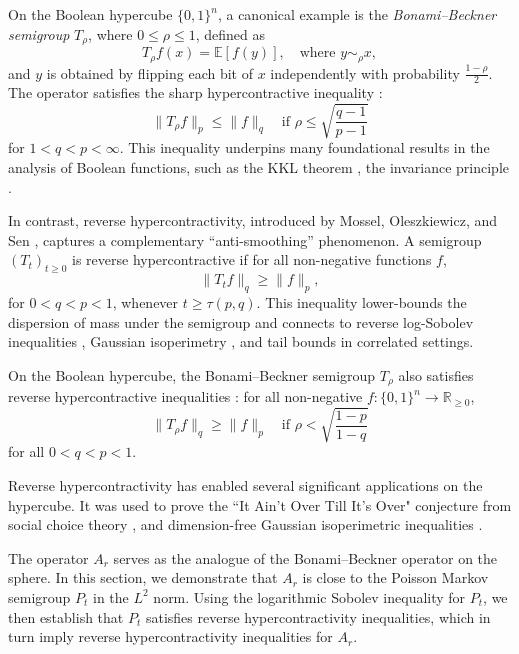 \documentclass[11pt]{article}
\begin{document}
On the Boolean hypercube \(\{0,1\}^n\), a canonical example is the \emph{Bonami–Beckner semigroup} \(T_\rho\), where \(0 \leq \rho \leq 1\), defined as
\[
T_\rho f(x) = \mathbb{E}[f(y)], \quad \text{where } y \sim_\rho x,
\]
and \(y\) is obtained by flipping each bit of \(x\) independently with probability \(\frac{1 - \rho}{2}\). The operator satisfies the sharp hypercontractive inequality \cite{bonami1970etude, nelson1973free, beckner1975inequalities, gross1975logarithmic}:
\[
\|T_\rho f\|_p \le \|f\|_q \quad \text{if } \rho \le \sqrt{\frac{q-1}{p-1}}
\]
for $1<q<p<\infty$. 
This inequality underpins many foundational results in the analysis of Boolean functions, such as the KKL theorem \cite{mossel2013reverse}, the invariance principle \cite{mossel2013reverse}.

In contrast, reverse hypercontractivity, introduced by Mossel, Oleszkiewicz, and Sen \cite{mossel2013reverse}, captures a complementary ``anti-smoothing'' phenomenon. A semigroup \( (T_t)_{t \geq 0} \) is reverse hypercontractive if for all non-negative functions \(f\),
\[
\|T_t f\|_q \ge \|f\|_p,
\]
for \(0 < q < p < 1\), whenever \(t \ge \tau(p,q)\). This inequality lower-bounds the dispersion of mass under the semigroup and connects to reverse log-Sobolev inequalities \cite{mossel2013reverse}, Gaussian isoperimetry \cite{mossel2015robust}, and tail bounds in correlated settings.

On the Boolean hypercube, the Bonami–Beckner semigroup \(T_\rho\) also satisfies reverse hypercontractive inequalities \cite{mossel2013reverse}: for all non-negative $f : \{0,1\}^n \to \mathbb{R}_{\geq 0}$,
\[
\|T_\rho f\|_q \ge \|f\|_p\quad\text{if } \rho < \sqrt{\frac{1 - p}{1 - q}} 
\]
for all $0<q<p<1$. 

Reverse hypercontractivity has enabled several significant applications on the hypercube. It was used to prove the ``It Ain’t Over Till It’s Over" conjecture \cite{khot2002power} from social choice theory \cite{mossel2005noise}, and dimension-free Gaussian isoperimetric inequalities \cite{mossel2015robust}.

The operator $A_r$ serves as the analogue of the Bonami–Beckner operator on the sphere. In this section, we demonstrate that $A_r$ is close to the Poisson Markov semigroup $P_t$ in the $L^2$ norm. Using the logarithmic Sobolev inequality for $P_t$, we then establish that $P_t$ satisfies reverse hypercontractivity inequalities, which in turn imply reverse hypercontractivity inequalities for $A_r$.
\end{document}
